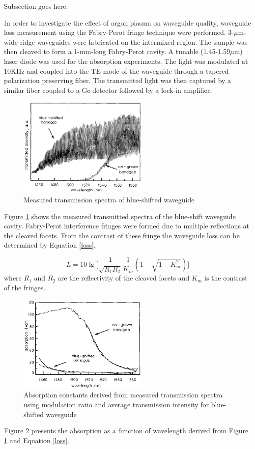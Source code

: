 Subsection goes here.

In order to investigate the effect of argon plasma on waveguide quality,
waveguide loss measurement using the Fabry-Perot fringe technique were
performed. 3-$\mu$m-wide ridge waveguides were fabricated on the intermixed
region. The sample was then cleaved to form a 1-mm-long Fabry-Perot cavity.
A tunable (1.45-1.59$\mu$m) laser diode was used for the absorption experiments.
The light was modulated at 10KHz and coupled into the TE mode of the
waveguide through a tapered polarization preserving fiber. The transmitted
light was then captured by a similar fiber coupled to a Ge-detector followed
by a lock-in amplifier.

\begin{figure}[!t]
    \centering
    \includegraphics[width=2.5in]{fig/waveguide1}
    \caption{Measured transmission spectra of blue-shifted waveguide}
    \label{ex_waveguide1}
\end{figure}
Figure \ref{ex_waveguide1} shows the measured transmitted spectra of the blue-shift
waveguide cavity. Fabry-Perot interference fringes were formed due to multiple
reflections at the cleaved facets. From the contrast of these fringe the waveguide
loss can be determined by Equation \ref{loss},

\begin{equation}\label{loss}
    L=10\lg\Big[\frac{1}{\sqrt{R_1R_2}}\frac{1}{K_m}(1-\sqrt{1-K_m^2})\Big]
\end{equation}
where $R_1$ and $R_2$ are the reflectivity of the cleaved facets
and $K_m$ is the contrast of the fringes.

\begin{figure}[!t]
    \centering
    \includegraphics[width=2.5in]{fig/waveguide2}
    \caption{Absorption constants derived from measured transmission spectra
        using modulation ratio and average transmission intensity for
        blue-shifted waveguide}
    \label{ex_waveguide2}
\end{figure}
Figure \ref{ex_waveguide2} presents the absorption as a function of wavelength
derived from Figure \ref{ex_waveguide1} and Equation \ref{loss}.
